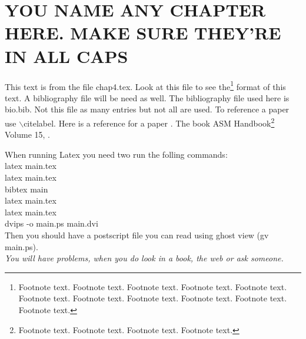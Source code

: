 \chapter{YOU NAME ANY CHAPTER HERE. MAKE SURE THEY'RE IN ALL CAPS} \label{lable_the_chapter_here}

This text is from the file chap4.tex.  Look at this file to see
the\footnote{Footnote text. Footnote text. Footnote text. Footnote
  text. Footnote text. Footnote text. Footnote text. Footnote text.
  Footnote text. Footnote text. Footnote text.}  format of this text.
A bibliography file will be need as well.  The bibliography file used
here is bio.bib.  Not this file as many entries but not all are used.
To reference a paper use $\backslash$cite{label}.  Here is a reference
for a paper \cite{Hagstrom_and_Hariharan}.  The book ASM
Handbook\footnote{Footnote text. Footnote text. Footnote text.
  Footnote text.}  Volume 15, \cite{Casting15}.

When running Latex you need two run the folling commands: \\
latex main.tex\\
latex main.tex\\
bibtex main\\
latex main.tex\\
latex main.tex\\
dvips -o main.ps main.dvi \\
Then you should have a postscript file you can read using ghost view (gv main.ps).
\ \\
{\em You will have problems, when you do look in a book, the web or ask someone.}




